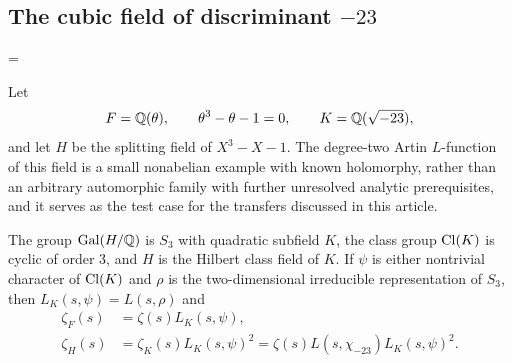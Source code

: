 \subsection{The cubic field of discriminant \texorpdfstring{$-23$}{-23}}\label{hec:ss:cubic}
{\emergencystretch=\textwidth{}}

Let
\[
 F=\mathbb{Q}(\theta),\qquad \theta^3-\theta-1=0,\qquad K=\mathbb{Q}(\sqrt{-23}),
\]
and let $H$ be the splitting field of $X^3-X-1$. The degree-two Artin $L$-function of this field is a small
nonabelian example with known holomorphy, rather than an arbitrary automorphic family with further
unresolved analytic prerequisites, and it serves as the test case for the transfers discussed in this
article.

\begin{proposition}\label{hec:prop:cubicfield}
The group $\operatorname{Gal}(H/\mathbb{Q})$ is $S_3$ with quadratic subfield $K$, the class group $\operatorname{Cl}(K)$ is cyclic of order
$3$, and $H$ is the Hilbert class field of $K$. If $\psi$ is either nontrivial character of $\operatorname{Cl}(K)$ and
$\rho$ is the two-dimensional irreducible representation of $S_3$, then $L_K(s,\psi)=L(s,\rho)$ and
\begin{align}
\zeta_F(s)&=\zeta(s)L_K(s,\psi),\label{hec:eq:cubic}\\
\zeta_H(s)&=\zeta_K(s)L_K(s,\psi)^2=\zeta(s)L(s,\chi_{-23})L_K(s,\psi)^2.\label{hec:eq:galois}
\end{align}
\end{proposition}

